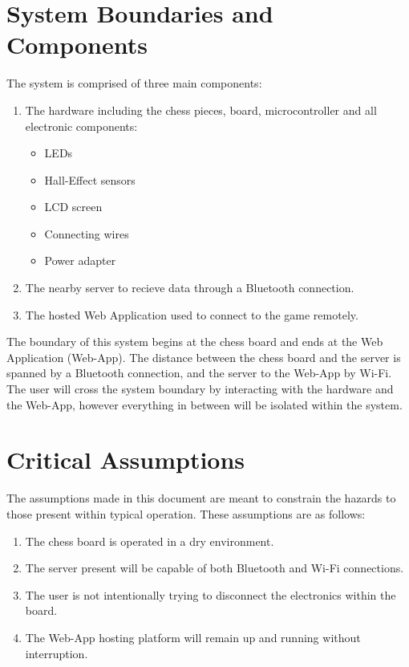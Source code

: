 \documentclass{article}
\begin{document}
\section{System Boundaries and Components}{
    The \progname{} system is comprised of three main components:
    \begin{enumerate}
        \item The hardware including the chess pieces, board, microcontroller and all electronic components:
        \begin{itemize}
            \item LEDs
            \item Hall-Effect sensors
            \item LCD screen
            \item Connecting wires
            \item Power adapter
        \end{itemize}
        \item The nearby server to recieve data through a Bluetooth connection.
        \item The hosted Web Application used to connect to the game remotely.
    \end{enumerate}

    The boundary of this system begins at the chess board and ends at the Web Application (Web-App). The distance between the chess board and the server is spanned by a Bluetooth connection, and the server to the Web-App by Wi-Fi. The user will cross the system boundary by interacting with the hardware and the Web-App, however everything in between will be isolated within the system.
}

\section{Critical Assumptions}

The assumptions made in this document are meant to constrain the hazards to those present within typical operation. These assumptions are as follows:
\begin{enumerate}
    \item The chess board is operated in a dry environment.
    \item The server present will be capable of both Bluetooth and Wi-Fi connections.
    \item The user is not intentionally trying to disconnect the electronics within the board.
    \item The Web-App hosting platform will remain up and running without interruption.
\end{enumerate}
\end{document}
